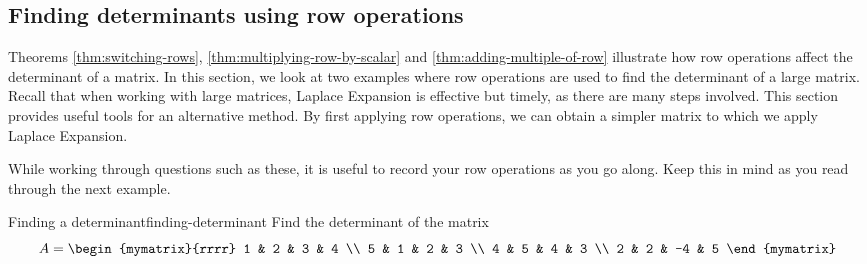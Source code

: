 \subsection{Finding determinants using row operations}

Theorems \ref{thm:switching-rows}, \ref{thm:multiplying-row-by-scalar} and \ref{thm:adding-multiple-of-row} illustrate 
how row operations affect the determinant of a matrix. In this section, we look at two examples where row operations are 
used to find the determinant of a large matrix. Recall that when working with large matrices, Laplace Expansion
is effective but timely, as there are many steps involved. This section provides useful tools for
an alternative method. By first applying row operations, we can obtain a simpler matrix to which we apply Laplace Expansion. 

While working through questions such as these, it is useful to record your row operations as you go along. Keep this in mind
as you read through the next example. 

\begin{example}{Finding a determinant}{finding-determinant}
Find the determinant of the matrix
\begin{equation*}
A=\begin{mymatrix}{rrrr}
1 & 2 & 3 & 4 \\
5 & 1 & 2 & 3 \\
4 & 5 & 4 & 3 \\
2 & 2 & -4 & 5
\end{mymatrix}
\end{equation*}
\end{example}

